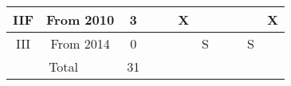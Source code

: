 \begin{table}[tb]
{\begin{tabular}{|c|c|c|r|r|r|r|r|r|r|r|}
\hline
IIF   & From 2010 & 3     & \multicolumn{1}{c|}{} & \multicolumn{1}{c|}{} & \multicolumn{1}{c|}{X} & \multicolumn{1}{c|}{} & \multicolumn{1}{c|}{} & \multicolumn{1}{c|}{} & \multicolumn{1}{c|}{} & \multicolumn{1}{c|}{X} \bigstrut\\
\hline
III   & From 2014 & 0     & \multicolumn{1}{c|}{} & \multicolumn{1}{c|}{} & \multicolumn{1}{c|}{} & \multicolumn{1}{c|}{S} & \multicolumn{1}{c|}{} & \multicolumn{1}{c|}{} & \multicolumn{1}{c|}{S} & \multicolumn{1}{c|}{} \bigstrut\\
\hline
\multicolumn{2}{|c|}{Total} & 31    & \multicolumn{1}{r}{} & \multicolumn{1}{r}{} & \multicolumn{1}{r}{} & \multicolumn{1}{r}{} & \multicolumn{1}{r}{} & \multicolumn{1}{r}{} & \multicolumn{1}{r}{} & \multicolumn{1}{r}{} \bigstrut\\
\cline{1-3}

\end{tabular}%
    }
  \label{tab:gps_table}%
\end{table}%

